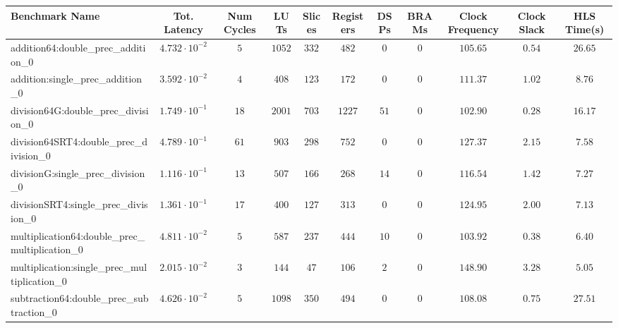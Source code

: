 \begin{tabular}{|l|c|c|c|c|c|c|c|c|c|c|}
\hline
Benchmark Name                                   & Tot. Latency            & Num Cycles & LUTs     & Slices   & Registers & DSPs   & BRAMs & Clock Frequency & Clock Slack & HLS Time(s) \\
\hline
addition64:double\_prec\_addition\_0             & $ 4.732 \cdot 10^{-2} $ & $ 5      $ & $ 1052 $ & $ 332  $ & $ 482   $ & $ 0  $ & $ 0 $ & $ 105.65      $ & $ 0.54    $ & $ 26.65   $ \\
addition:single\_prec\_addition\_0               & $ 3.592 \cdot 10^{-2} $ & $ 4      $ & $ 408  $ & $ 123  $ & $ 172   $ & $ 0  $ & $ 0 $ & $ 111.37      $ & $ 1.02    $ & $ 8.76    $ \\
division64G:double\_prec\_division\_0            & $ 1.749 \cdot 10^{-1} $ & $ 18     $ & $ 2001 $ & $ 703  $ & $ 1227  $ & $ 51 $ & $ 0 $ & $ 102.90      $ & $ 0.28    $ & $ 16.17   $ \\
division64SRT4:double\_prec\_division\_0         & $ 4.789 \cdot 10^{-1} $ & $ 61     $ & $ 903  $ & $ 298  $ & $ 752   $ & $ 0  $ & $ 0 $ & $ 127.37      $ & $ 2.15    $ & $ 7.58    $ \\
divisionG:single\_prec\_division\_0              & $ 1.116 \cdot 10^{-1} $ & $ 13     $ & $ 507  $ & $ 166  $ & $ 268   $ & $ 14 $ & $ 0 $ & $ 116.54      $ & $ 1.42    $ & $ 7.27    $ \\
divisionSRT4:single\_prec\_division\_0           & $ 1.361 \cdot 10^{-1} $ & $ 17     $ & $ 400  $ & $ 127  $ & $ 313   $ & $ 0  $ & $ 0 $ & $ 124.95      $ & $ 2.00    $ & $ 7.13    $ \\
multiplication64:double\_prec\_multiplication\_0 & $ 4.811 \cdot 10^{-2} $ & $ 5      $ & $ 587  $ & $ 237  $ & $ 444   $ & $ 10 $ & $ 0 $ & $ 103.92      $ & $ 0.38    $ & $ 6.40    $ \\
multiplication:single\_prec\_multiplication\_0   & $ 2.015 \cdot 10^{-2} $ & $ 3      $ & $ 144  $ & $ 47   $ & $ 106   $ & $ 2  $ & $ 0 $ & $ 148.90      $ & $ 3.28    $ & $ 5.05    $ \\
subtraction64:double\_prec\_subtraction\_0       & $ 4.626 \cdot 10^{-2} $ & $ 5      $ & $ 1098 $ & $ 350  $ & $ 494   $ & $ 0  $ & $ 0 $ & $ 108.08      $ & $ 0.75    $ & $ 27.51   $ \\

\end{tabular}
